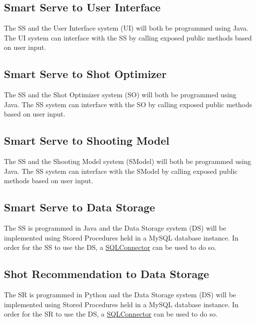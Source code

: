 \documentclass[11pt]{article}
\begin{document}
\subsection{Smart Serve to User Interface}
The SS and the User Interface system (UI) will both be programmed using Java. The UI system can interface with the SS by calling exposed public methods based on user input.
\subsection{Smart Serve to Shot Optimizer}
The SS and the Shot Optimizer system (SO) will both be programmed using Java. The SS system can interface with the SO by calling exposed public methods based on user input.
\subsection{Smart Serve to Shooting Model}
The SS and the Shooting Model system (SModel) will both be programmed using Java. The SS system can interface with the SModel by calling exposed public methods based on user input.
\subsection{Smart Serve to Data Storage}
The SS is programmed in Java and the Data Storage system (DS) will be implemented using Stored Procedures held in a MySQL database instance. In order for the SS to use the DS, a \href{https://dev.mysql.com/downloads/connector/j/5.1.html}{SQLConnector} can be used to do so. 
\subsection{Shot Recommendation to Data Storage}
The SR is programmed in Python and the Data Storage system (DS) will be implemented using Stored Procedures held in a MySQL database instance. In order for the SR to use the DS, a \href{https://dev.mysql.com/doc/connector-python/en/}{SQLConnector} can be used to do so. 
\end{document}
